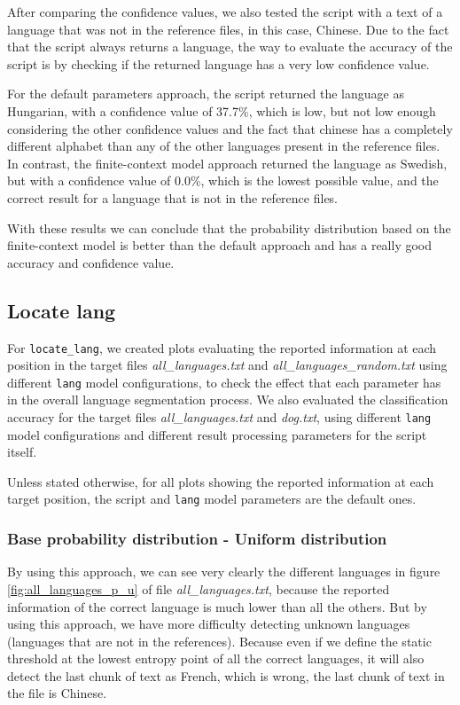 \documentclass{article}
\begin{document}
After comparing the confidence values, we also tested the script with a text of a language that was not in the reference files, in this case, Chinese.
Due to the fact that the script always returns a language, the way to evaluate the accuracy of the script is by checking if the returned language has a very low confidence value.

For the default parameters approach, the script returned the language as Hungarian, with a confidence value of 37.7\%, which is low, but not low enough considering the other confidence values and
the fact that chinese has a completely different alphabet than any of the other languages present in the reference files.
In contrast, the finite-context model approach returned the language as Swedish, but with a confidence value of 0.0\%, which is the lowest possible value, and the correct result
for a language that is not in the reference files.

With these results we can conclude that the probability distribution based on the finite-context model is better than the default approach and has a really good accuracy and confidence value.

\subsection{Locate lang}
\label{subsec:results_locate_lang}

For \texttt{locate\_lang}, we created plots evaluating the reported information at each position in the target files \textit{all\_languages.txt} and \textit{all\_languages\_random.txt} using different \texttt{lang} model configurations, to check the effect that each parameter has in the overall language segmentation process.
We also evaluated the classification accuracy for the target files \textit{all\_languages.txt} and \textit{dog.txt}, using different \texttt{lang} model configurations and different result processing parameters for the script itself.

Unless stated otherwise, for all plots showing the reported information at each target position, the script and \texttt{lang} model parameters are the default ones.

\subsubsection{Base probability distribution - Uniform distribution}
\label{subsubsec:results_locate_lang_uniform_distribution}

By using this approach, we can see very clearly the different languages in figure \ref{fig:all_languages_p_u} of file \textit{all\_languages.txt},
because the reported information of the correct language is much lower than all the others.
But by using this approach, we have more difficulty detecting unknown languages (languages that are not in the references).
Because even if we define the static threshold at the lowest entropy point of all the correct languages,
it will also detect the last chunk of text as French, which is wrong, the last chunk of text in the file is Chinese. %
\end{document}
